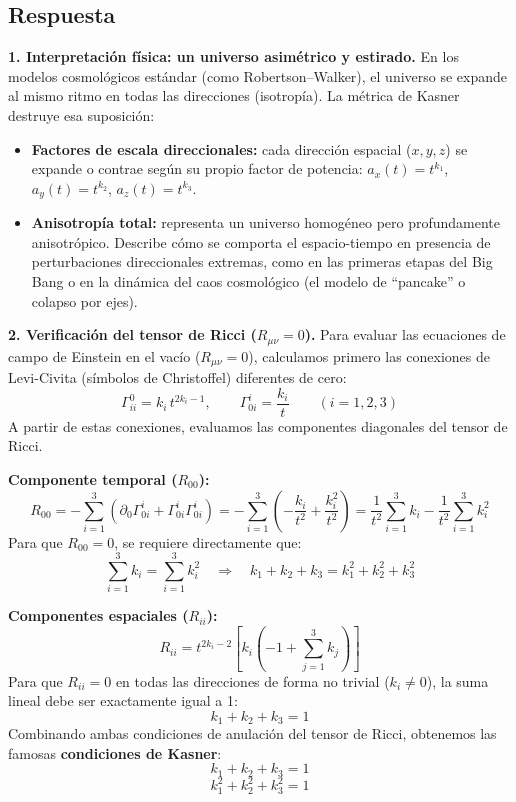 \documentclass[11pt,a4paper]{article}
\begin{document}
\subsection*{Respuesta}

\noindent\textbf{1. Interpretación física: un universo asimétrico y estirado.} En los modelos cosmológicos estándar (como Robertson--Walker), el universo se expande al mismo ritmo en todas las direcciones (isotropía). La métrica de Kasner destruye esa suposición:
\begin{itemize}
  \item \textbf{Factores de escala direccionales:} cada dirección espacial ($x,y,z$) se expande o contrae según su propio factor de potencia: $a_x(t)=t^{k_1}$, $a_y(t)=t^{k_2}$, $a_z(t)=t^{k_3}$.
  \item \textbf{Anisotropía total:} representa un universo homogéneo pero profundamente anisotrópico. Describe cómo se comporta el espacio-tiempo en presencia de perturbaciones direccionales extremas, como en las primeras etapas del Big Bang o en la dinámica del caos cosmológico (el modelo de ``pancake'' o colapso por ejes).
\end{itemize}

\noindent\textbf{2. Verificación del tensor de Ricci ($R_{\mu\nu}=0$).} Para evaluar las ecuaciones de campo de Einstein en el vacío ($R_{\mu\nu}=0$), calculamos primero las conexiones de Levi-Civita (símbolos de Christoffel) diferentes de cero:
\[
\Gamma^0_{ii} = k_i\,t^{2k_i-1}, \qquad \Gamma^i_{0i} = \frac{k_i}{t} \qquad (i=1,2,3)
\]
A partir de estas conexiones, evaluamos las componentes diagonales del tensor de Ricci.

\textbf{Componente temporal ($R_{00}$):}
\[
R_{00} = -\sum_{i=1}^3 \left( \partial_0\Gamma^i_{0i} + \Gamma^i_{0i}\Gamma^i_{0i} \right) = -\sum_{i=1}^3 \left( -\frac{k_i}{t^2} + \frac{k_i^2}{t^2} \right) = \frac{1}{t^2}\sum_{i=1}^3 k_i - \frac{1}{t^2}\sum_{i=1}^3 k_i^2
\]
Para que $R_{00}=0$, se requiere directamente que:
\[
\sum_{i=1}^3 k_i = \sum_{i=1}^3 k_i^2 \quad\Longrightarrow\quad k_1+k_2+k_3 = k_1^2+k_2^2+k_3^2
\]

\textbf{Componentes espaciales ($R_{ii}$):}
\[
R_{ii} = t^{2k_i-2}\left[ k_i\left( -1 + \sum_{j=1}^3 k_j \right) \right]
\]
Para que $R_{ii}=0$ en todas las direcciones de forma no trivial ($k_i\neq0$), la suma lineal debe ser exactamente igual a 1:
\[
k_1+k_2+k_3 = 1
\]
Combinando ambas condiciones de anulación del tensor de Ricci, obtenemos las famosas \textbf{condiciones de Kasner}:
\[
k_1+k_2+k_3 = 1
\]
\[
k_1^2+k_2^2+k_3^2 = 1
\]
\end{document}
